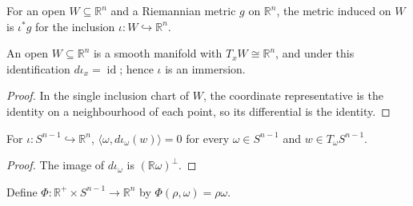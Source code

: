 \begin{definition}
\label{def:open-submanifold-metric}





For an open $W\subseteq\mathbb R^n$ and a Riemannian metric $g$ on $\mathbb R^n$, the metric induced on $W$ is $\iota^*g$ for the inclusion $\iota:W\hookrightarrow\mathbb R^n$.
\end{definition}

\begin{lemma}
\label{lem:mfderiv-open-inclusion}




An open $W\subseteq\mathbb R^n$ is a smooth manifold with $T_xW\cong\mathbb R^n$, and under this identification $d\iota_x=\operatorname{id}$; hence $\iota$ is an immersion.
\end{lemma}

\begin{proof}

\sketch In the single inclusion chart of $W$, the coordinate representative is the identity on a neighbourhood of each point, so its differential is the identity.
\end{proof}

\begin{lemma}
\label{lem:sphere-tangent-orthogonal-radius}





For $\iota:S^{n-1}\hookrightarrow\mathbb R^n$, $\langle\omega,d\iota_\omega(w)\rangle=0$ for every $\omega\in S^{n-1}$ and $w\in T_\omega S^{n-1}$.
\end{lemma}

\begin{proof}

\sketch The image of $d\iota_\omega$ is $(\mathbb R\omega)^\perp$.
\end{proof}

\begin{definition}
\label{def:polar-map}





Define $\Phi:\mathbb R^+\times S^{n-1}\to\mathbb R^n$ by $\Phi(\rho,\omega)=\rho\omega$.
\end{definition}

